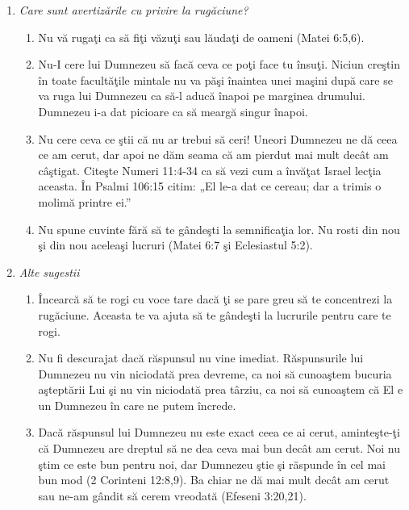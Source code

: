 \begin{enumerate}
\begin{enumerate}
	\end{enumerate}
	
	\item \textit{Care sunt avertizările cu privire la rugăciune?}

	\begin{enumerate}
	
		\item Nu vă rugaţi ca să fiţi văzuţi sau lăudaţi de oameni (Matei 6:5,6).
		\item Nu-I cere lui Dumnezeu să facă ceva ce poţi face tu însuţi. Niciun creştin în toate facultăţile mintale nu va păşi înaintea unei maşini după care se va ruga lui Dumnezeu ca să-l aducă înapoi pe marginea drumului. Dumnezeu i-a dat picioare ca să meargă singur înapoi.
		\item Nu cere ceva ce ştii că nu ar trebui să ceri! Uneori Dumnezeu ne dă ceea ce am cerut, dar apoi ne dăm seama că am pierdut mai mult decât am câştigat. Citeşte Numeri 11:4-34 ca să vezi cum a învăţat Israel lecţia aceasta. În Psalmi 106:15 citim: „El le-a dat ce cereau; dar a trimis o molimă printre ei.”
		\item Nu spune cuvinte fără să te gândeşti la semnificaţia lor. Nu rosti din nou şi din nou aceleaşi lucruri (Matei 6:7 şi Eclesiastul 5:2).
		
	\end{enumerate}

	\item \textit{Alte sugestii}
	
	\begin{enumerate}
	
		\item Încearcă să te rogi cu voce tare dacă ţi se pare greu să te concentrezi la rugăciune. Aceasta te va ajuta să te gândeşti la lucrurile pentru care te rogi.
		\item Nu fi descurajat dacă răspunsul nu vine imediat. Răspunsurile lui Dumnezeu nu vin niciodată prea devreme, ca noi să cunoaştem bucuria aşteptării Lui şi nu vin niciodată prea târziu, ca noi să cunoaştem că El e un Dumnezeu în care ne putem încrede.
		\item Dacă răspunsul lui Dumnezeu nu este exact ceea ce ai cerut, aminteşte-ţi că Dumnezeu are dreptul să ne dea ceva mai bun decât am cerut. Noi nu ştim ce este bun pentru noi, dar Dumnezeu ştie şi răspunde în cel mai bun mod (2 Corinteni 12:8,9). Ba chiar ne dă mai mult decât am cerut sau ne-am gândit să cerem vreodată (Efeseni 3:20,21).

	\end{enumerate}
	
\end{enumerate}